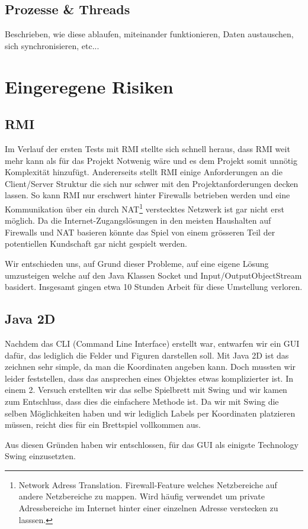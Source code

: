 \documentclass[a4paper,12pt,halfparskip,DIV14]{scrartcl}
\begin{document}
\subsection{Prozesse \& Threads} %
\label{sub:prozesse_threads}
Beschrieben, wie diese ablaufen, miteinander funktionieren, Daten austauschen, sich synchronisieren, etc...


\section{Eingeregene Risiken} %
\label{sec:risiken}

\subsection{RMI} %
\label{sub:rmi}

Im Verlauf der ersten Tests mit RMI stellte sich schnell heraus, dass RMI weit mehr kann als für das Projekt Notwenig wäre und es dem Projekt somit unnötig Komplexität hinzufügt. Andererseits stellt RMI  einige Anforderungen an die Client/Server Struktur die sich nur schwer mit den Projektanforderungen decken lassen. So kann RMI nur erschwert hinter Firewalls betrieben werden und eine Kommunikation über ein durch NAT\footnote{Network Adress Translation. Firewall-Feature welches Netzbereiche auf andere Netzbereiche zu mappen. Wird häufig verwendet um private Adressbereiche im Internet hinter einer einzelnen Adresse verstecken zu lasssen.} verstecktes Netzwerk ist gar nicht erst möglich. Da die Internet-Zugangslösungen in den meisten Haushalten auf Firewalls und NAT basieren könnte das Spiel von einem grösseren Teil der potentiellen Kundschaft gar nicht gespielt werden.

Wir entschieden uns, auf Grund dieser Probleme, auf eine eigene Lösung umzusteigen welche auf den Java Klassen Socket und Input/OutputObjectStream basidert. Insgesamt gingen etwa 10 Stunden Arbeit für diese Umstellung verloren.

\subsection{Java 2D} %
\label{sub:java_2d}

Nachdem das CLI (Command Line Interface) erstellt war, entwarfen wir ein GUI dafür, das lediglich die Felder und Figuren darstellen soll. Mit Java 2D ist das zeichnen sehr simple, da man die Koordinaten angeben kann. Doch mussten wir leider feststellen, dass das ansprechen eines Objektes etwas komplizierter ist. In einem 2. Versuch erstellten wir das selbe Spielbrett mit Swing und wir kamen zum Entschluss, dass dies die einfachere Methode ist. Da wir mit Swing die selben Möglichkeiten haben und wir lediglich Labels per Koordinaten platzieren müssen, reicht dies für ein Brettspiel vollkommen aus. 

Aus diesen Gründen haben wir entschlossen, für das GUI als einigste Technology Swing einzusetzten.


\end{document}

